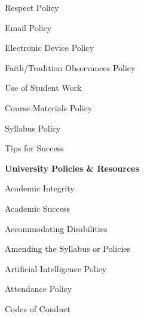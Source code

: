 \documentclass[11pt,letterpaper]{article}
\begin{document}
\begin{minipage}[t]{0.45\textwidth}
\hspace{0.3cm} Respect Policy \dotfill \pageref{respect} \par
\hspace{0.3cm} Email Policy \dotfill \pageref{email_policy} \par 
\hspace{0.3cm} Electronic Device Policy \dotfill \pageref{electronic} \par
\hspace{0.3cm} Faith/Tradition Observances Policy \dotfill \pageref{faith} \par
\hspace{0.3cm} Use of Student Work \dotfill \pageref{std_work} \par
\end{minipage} \hfill \begin{minipage}[t]{0.45\textwidth} \par %
\hspace{0.3cm} Course Materials Policy \dotfill \pageref{copyright} \par
\hspace{0.3cm} Syllabus Policy \dotfill \pageref{syllabus} \par
\hspace{0.3cm} Tips for Success \dotfill \pageref{tips} \par
{\bfseries\color{scred} University Policies \& Resources} \dotfill \pageref{univ_policies} \par
\hspace{0.3cm} Academic Integrity \dotfill \pageref{univ_academicintegrity} \par
\hspace{0.3cm} Academic Success \dotfill \pageref{univ_success} \par
\hspace{0.3cm} Accommodating Disabilities \dotfill \pageref{univ_ada} \par
\hspace{0.3cm} Amending the Syllabus or Policies \dotfill \pageref{univ_amending} \par
\hspace{0.3cm} Artificial Intelligence Policy \dotfill \pageref{univ_artintel} \par
\hspace{0.3cm} Attendance Policy \dotfill \pageref{univ_attendance} \par
\hspace{0.3cm} Codes of Conduct \dotfill \pageref{univ_conduct} \par

\end{minipage}
\end{document}
